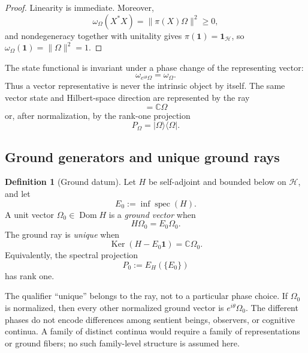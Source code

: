 \documentclass[11pt,reqno]{scrartcl}
\newcommand{\CC}{\mathbb C}
\newcommand{\idop}{\mathbf 1}
\newcommand{\ket}[1]{\lvert #1\rangle}
\newcommand{\bra}[1]{\langle #1\rvert}
\DeclareMathOperator{\Dom}{Dom}
\DeclareMathOperator{\Ker}{Ker}
\DeclareMathOperator{\spec}{spec}
\theoremstyle{plain}
\theoremstyle{definition}
\newtheorem{definition}[definition]{Definition}
\theoremstyle{remark}
\begin{document}
\begin{proof}
Linearity is immediate.  Moreover,
\begin{equation}
  \omega_{\Omega}(X^*X)
  =\|\pi(X)\Omega\|^2\geq0,
\end{equation}
and nondegeneracy together with unitality gives
$\pi(\idop)=\idop_{\mathscr H}$, so
$\omega_{\Omega}(\idop)=\|\Omega\|^2=1$.
\end{proof}

The state functional is invariant under a phase change of the representing
vector:
\begin{equation}
  \omega_{e^{i\theta}\Omega}=\omega_{\Omega}.
\end{equation}
Thus a vector representative is never the intrinsic object by itself.  The
same vector state and Hilbert-space direction are represented by the ray
\begin{equation}
  [\Omega]=\CC\Omega
\end{equation}
or, after normalization, by the rank-one projection
\begin{equation}
  P_{\Omega}=\ket\Omega\!\bra\Omega.
\end{equation}

\subsection{Ground generators and unique ground rays}

\begin{definition}[Ground datum]
\label{def:ground-datum}
Let $H$ be self-adjoint and bounded below on $\mathscr H$, and let
\begin{equation}
  E_0:=\inf\spec(H).
\end{equation}
A unit vector $\Omega_0\in\Dom H$ is a \emph{ground vector} when
\begin{equation}
  H\Omega_0=E_0\Omega_0.
\end{equation}
The ground ray is \emph{unique} when
\begin{equation}
  \Ker(H-E_0\idop)=\CC\Omega_0.
  \label{eq:generic-unique-ground}
\end{equation}
Equivalently, the spectral projection
\begin{equation}
  P_0:=E_H(\{E_0\})
\end{equation}
has rank one.
\end{definition}

The qualifier ``unique'' belongs to the ray, not to a particular phase choice.
If $\Omega_0$ is normalized, then every other normalized ground vector is
$e^{i\theta}\Omega_0$.  The different phases do not encode differences among
sentient beings, observers, or cognitive continua.  A family of distinct
continua would require a family of representations or ground fibers; no such
family-level structure is assumed here.
\end{document}
